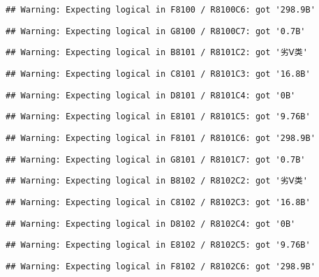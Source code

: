 \documentclass[
]{article}
\begin{document}
\begin{verbatim}
## Warning: Expecting logical in F8100 / R8100C6: got '298.9B'
\end{verbatim}

\begin{verbatim}
## Warning: Expecting logical in G8100 / R8100C7: got '0.7B'
\end{verbatim}

\begin{verbatim}
## Warning: Expecting logical in B8101 / R8101C2: got '劣Ⅴ类'
\end{verbatim}

\begin{verbatim}
## Warning: Expecting logical in C8101 / R8101C3: got '16.8B'
\end{verbatim}

\begin{verbatim}
## Warning: Expecting logical in D8101 / R8101C4: got '0B'
\end{verbatim}

\begin{verbatim}
## Warning: Expecting logical in E8101 / R8101C5: got '9.76B'
\end{verbatim}

\begin{verbatim}
## Warning: Expecting logical in F8101 / R8101C6: got '298.9B'
\end{verbatim}

\begin{verbatim}
## Warning: Expecting logical in G8101 / R8101C7: got '0.7B'
\end{verbatim}

\begin{verbatim}
## Warning: Expecting logical in B8102 / R8102C2: got '劣Ⅴ类'
\end{verbatim}

\begin{verbatim}
## Warning: Expecting logical in C8102 / R8102C3: got '16.8B'
\end{verbatim}

\begin{verbatim}
## Warning: Expecting logical in D8102 / R8102C4: got '0B'
\end{verbatim}

\begin{verbatim}
## Warning: Expecting logical in E8102 / R8102C5: got '9.76B'
\end{verbatim}

\begin{verbatim}
## Warning: Expecting logical in F8102 / R8102C6: got '298.9B'
\end{verbatim}
\end{document}
